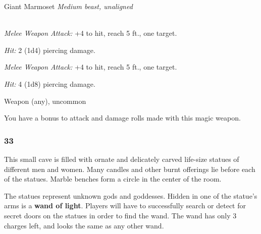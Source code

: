 \documentclass[palace_of_the_silver_princess]{subfiles}
\begin{document}
\begin{monsterbox}{Giant Marmoset}
    \textit{Medium beast, unaligned}\\
    \hline
    \basics[%
        armorclass = 15,
        hitpoints  = 13 (3d8 + 3),
        speed      = {40~ft., climb 30~ft.}
    ]
    \hline
    \stats[
        STR = \stat{11},
        DEX = \stat{15},
        CON = \stat{13},
        INT = \stat{2},
        WIS = \stat{11},
        CHA = \stat{11}
    ]
    \hline
    \details[
        senses = {passive Perception 10},
        languages = {Common},
        challenge = {1 (200 XP)},
    ]
    \hline
    \\[1mm]
    \begin{monsteraction}
        \textit{Melee Weapon Attack:} +4 to hit, reach 5 ft., one
        target.

        \textit{Hit:} 2 (1d4) piercing damage.
    \end{monsteraction}

    \begin{monsteraction}[Bite]
        \textit{Melee Weapon Attack:} +4 to hit, reach 5 ft., one
        target.

        \textit{Hit:} 4 (1d8) piercing damage.
    \end{monsteraction}
\end{monsterbox}


{Weapon (any), uncommon}

You have a bonus to attack and damage rolls made with this magic weapon.

\subsubsection{33}
\begin{quotebox}
    This small cave is filled with ornate and delicately carved
    life-size statues of different men and women. Many candles and other
    burnt offerings lie before each of the statues. Marble benches form
    a circle in the center of the room.
\end{quotebox}

The statues represent unknown gods and goddesses. Hidden in one of the
statue’s arms is a \textbf{wand of light}. Players will have to
successfully search or detect for secret doors on the statues in order
to find the wand. The wand has only 3 charges left, and looks the same
as any other wand.
\end{document}
